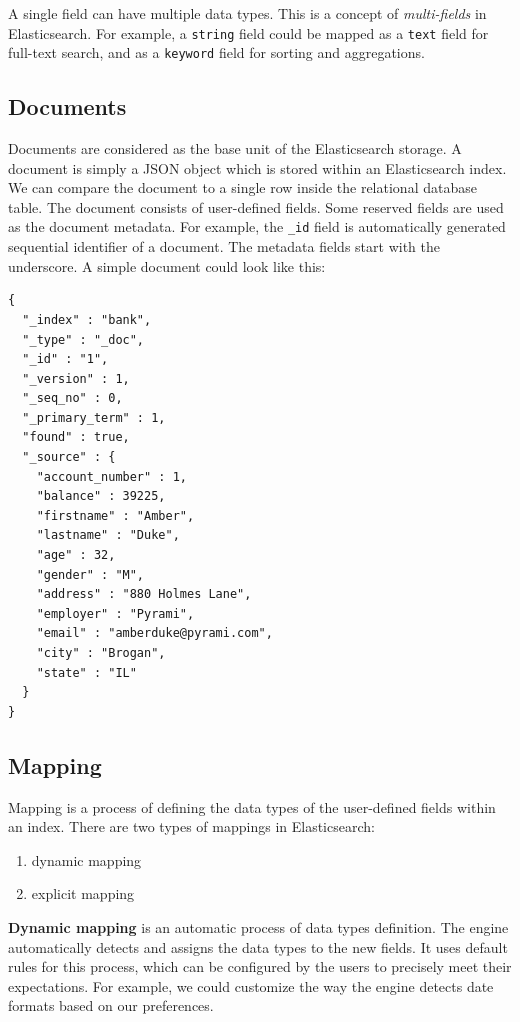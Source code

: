 \documentclass[12pt,a4,twoside]{article}
\newenvironment{code}{\captionsetup{type=listing, justification=centering}}{}
\begin{document}
A single field can have multiple data types. This is a concept of \textit{multi-fields} in Elasticsearch. For example, a \texttt{string} field could be mapped as a \texttt{text} field for full-text search, and as a \texttt{keyword} field for sorting and aggregations.

\subsection{Documents}

Documents are considered as the base unit of the Elasticsearch storage. A document is simply a JSON object which is stored within an Elasticsearch index. We can compare the document to a single row inside the relational database table. The document consists of user-defined fields. Some reserved fields are used as the document metadata. For example, the \texttt{\_id} field is automatically generated sequential identifier of a document. The metadata fields start with the underscore. A simple document could look like this:

\begin{code}
\begin{verbatim}
{
  "_index" : "bank",
  "_type" : "_doc",
  "_id" : "1",
  "_version" : 1,
  "_seq_no" : 0,
  "_primary_term" : 1,
  "found" : true,
  "_source" : {
    "account_number" : 1,
    "balance" : 39225,
    "firstname" : "Amber",
    "lastname" : "Duke",
    "age" : 32,
    "gender" : "M",
    "address" : "880 Holmes Lane",
    "employer" : "Pyrami",
    "email" : "amberduke@pyrami.com",
    "city" : "Brogan",
    "state" : "IL"
  }
}
\end{verbatim}
\label{code:sample_doc}
\end{code}

\subsection{Mapping}
\label{sssec:mapping}

Mapping is a process of defining the data types of the user-defined fields within an index. There are two types of mappings in Elasticsearch:

\begin{enumerate}[noitemsep]
\item dynamic mapping
\item explicit mapping
\end{enumerate}

\textbf{Dynamic mapping} is an automatic process of data types definition. The engine automatically detects and assigns the data types to the new fields. It uses default rules for this process, which can be configured by the users to precisely meet their expectations. For example, we could customize the way the engine detects date formats based on our preferences.
\end{document}
